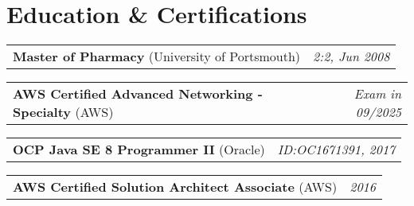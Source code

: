 \documentclass[letterpaper,11pt]{article}
\makeatletter
\newcommand{\cert}[3]{
    \begin{tabular*}{0.97\textwidth}{l@{\extracolsep{\fill}}r}
      \small{\textbf{#1} (#2)} & \small{#3}
    \end{tabular*}
}
\makeatother
\begin{document}
\section{Education \& Certifications}
\cert{Master of Pharmacy}{University of Portsmouth}{\textit{2:2, Jun 2008}}
\cert{AWS Certified Advanced Networking - Specialty}{AWS}{\textit{Exam in 09/2025}}
\cert{OCP Java SE 8 Programmer II}{Oracle}{\textit{ID:OC1671391, 2017}}
\cert{AWS Certified Solution Architect Associate}{AWS}{\textit{2016}}
\end{document}
